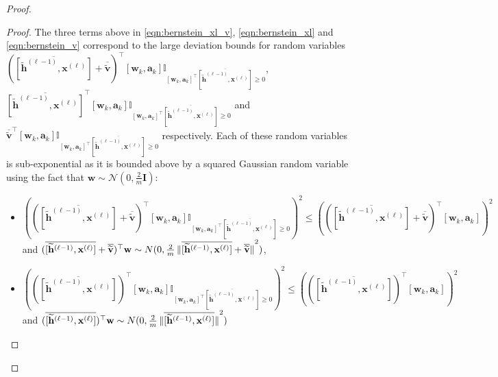 \begin{proof}
\begin{proof}
		
		The three terms above in \eqref{eqn:bernstein_xl_v}, \eqref{eqn:bernstein_xl} and \eqref{eqn:bernstein_v} correspond to the large deviation bounds for random variables $\left(\overline{[\widetilde{\mathbf{h}}^{(\ell-1)},  \mathbf{x}^{(\ell)}]} + \overline{\widetilde{\mathbf{v}}}\right)^{\top} [\mathbf{w}_{k}, \mathbf{a}_{k}] \mathbb{I}_{[\mathbf{w}_{k}, \mathbf{a}_{k}]^{\top} \overline{[\widetilde{\mathbf{h}}^{(\ell-1)},  \mathbf{x}^{(\ell)}]} \ge 0}$, $\overline{[\widetilde{\mathbf{h}}^{(\ell-1)},  \mathbf{x}^{(\ell)}]}^{\top} [\mathbf{w}_{k}, \mathbf{a}_{k}] \mathbb{I}_{[\mathbf{w}_{k}, \mathbf{a}_{k}]^{\top} \overline{[\widetilde{\mathbf{h}}^{(\ell-1)},  \mathbf{x}^{(\ell)}]} \ge 0}$ and $\overline{\widetilde{\mathbf{v}}}^{\top} [\mathbf{w}_{k}, \mathbf{a}_{k}] \mathbb{I}_{[\mathbf{w}_{k}, \mathbf{a}_{k}]^{\top} \overline{[\widetilde{\mathbf{h}}^{(\ell-1)},  \mathbf{x}^{(\ell)}]} \ge 0}$ respectively. Each of these random variables is
		sub-exponential as it is bounded above by a squared Gaussian random variable using the fact that $\mathbf{w} \sim \mathcal{N}\left(0, \frac{2}{m}\mathbf{I}\right)$:
		\begin{itemize}
			\item $((\overline{[\widetilde{\mathbf{h}}^{(\ell-1)},  \mathbf{x}^{(\ell)}]} + \overline{\widetilde{\mathbf{v}}})^{\top} [\mathbf{w}_{k}, \mathbf{a}_{k}] \mathbb{I}_{[\mathbf{w}_{k}, \mathbf{a}_{k}]^{\top} \overline{[\widetilde{\mathbf{h}}^{(\ell-1)},  \mathbf{x}^{(\ell)}]} \ge 0} )^2 \leq
			((\overline{[\widetilde{\mathbf{h}}^{(\ell-1)},  \mathbf{x}^{(\ell)}]} + \overline{\widetilde{\mathbf{v}}})^{\top} [\mathbf{w}_{k}, \mathbf{a}_{k}] )^2$ 
			and $(\overline{[\widetilde{\mathbf{h}}^{(\ell-1)},  \mathbf{x}^{(\ell)}]} + \overline{\widetilde{\mathbf{v}}})^{\top} \mathbf{w} \sim N(0, \frac{2}{m}\norm[0]{\overline{[\widetilde{\mathbf{h}}^{(\ell-1)},  \mathbf{x}^{(\ell)}]} + \overline{\widetilde{\mathbf{v}}}}^2)$,      
			
			
			
			\item $((\overline{[\widetilde{\mathbf{h}}^{(\ell-1)},  \mathbf{x}^{(\ell)}]})^{\top} [\mathbf{w}_{k}, \mathbf{a}_{k}] \mathbb{I}_{[\mathbf{w}_{k}, \mathbf{a}_{k}]^{\top} \overline{[\widetilde{\mathbf{h}}^{(\ell-1)},  \mathbf{x}^{(\ell)}]} \ge 0} )^2 \leq
			((\overline{[\widetilde{\mathbf{h}}^{(\ell-1)},  \mathbf{x}^{(\ell)}]})^{\top} [\mathbf{w}_{k}, \mathbf{a}_{k}] )^2$ 
			and $(\overline{[\widetilde{\mathbf{h}}^{(\ell-1)},  \mathbf{x}^{(\ell)}]})^{\top} \mathbf{w} \sim N(0, \frac{2}{m}\norm[0]{\overline{[\widetilde{\mathbf{h}}^{(\ell-1)},  \mathbf{x}^{(\ell)}]}}^2)$
			

\end{itemize}
\end{proof}
\end{proof}
